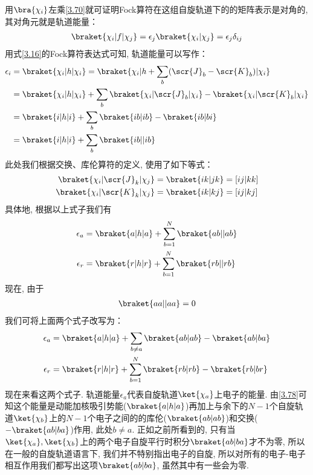 用$\bra{\chi_i}$左乘\eqref{3.70}就可证明Fock算符在这组自旋轨道下的的矩阵表示是对角的, 其对角元就是轨道能量：
\begin{align}
\braket{\chi_i|f|\chi_j} = \epsilon_j\braket{\chi_i|\chi_j} = \epsilon_j\delta_{ij}
\end{align}
用式\eqref{3.16}的Fock算符表达式可知, 轨道能量可以写作：
\begin{align}
\epsilon_i & = \braket{\chi_i|h|\chi_i} = \braket{\chi_i|h+\sum_b(\scr{J}_b-\scr{K}_b)|\chi_i}\notag\\
           & = \braket{\chi_i|h|\chi_i} + \sum_b\braket{\chi_i|\scr{J}_b|\chi_i} - \braket{\chi_i|\scr{K}_b|\chi_i}\notag\\
           & = \braket{i|h|i} + \sum_b\braket{ib|ib} - \braket{ib|bi}\notag\\
           & = \braket{i|h|i} + \sum_b\braket{ib||ib}
\label{3.72}
\end{align}
此处我们根据交换、库伦算符的定义, 使用了如下等式：
\begin{align}
\braket{\chi_i|\scr{J}_k|\chi_j} & = \braket{ik|jk} = [ij|kk]\\
\braket{\chi_i|\scr{K}_k|\chi_j} & = \braket{ik|kj} = [ij|kj]
\end{align}
具体地, 根据以上式子我们有
\begin{align}
\label{3.75}
\epsilon_a & = \braket{a|h|a} + \sum_{b=1}^{N}\braket{ab||ab}\\
\epsilon_r & = \braket{r|h|r} + \sum_{b=1}^{N}\braket{rb||rb}
\label{3.76}
\end{align}
现在, 由于
\begin{align}
\braket{aa||aa} = 0
\end{align}
我们可将上面两个式子改写为：
\begin{align}
\label{3.78}
\epsilon_a & = \braket{a|h|a} + \sum_{b\neq a}\braket{ab|ab} - \braket{ab|ba}\\
\epsilon_r & = \braket{r|h|r} + \sum_{b=1}^{N}\braket{rb|rb} - \braket{rb|br}
\label{3.79}
\end{align}
现在来看这两个式子. 轨道能量$\epsilon_a$代表自旋轨道$\ket{\chi_a}$上电子的能量. 由\eqref{3.78}可知这个能量是动能加核吸引势能($\braket{a|h|a}$)再加上与余下的$N-1$个自旋轨道$\ket{\chi_b}$上的$N-1$个电子之间的的库伦($\braket{ab|ab}$)和交换($-\braket{ab|ba}$)作用, 此处$b \neq a$. 正如之前所看到的, 只有当$\ket{\chi_a},\ket{\chi_b}$上的两个电子自旋平行时积分$\braket{ab|ba}$才不为零, 所以在一般的自旋轨道语言下, 我们并不特别指出电子的自旋, 所以对所有的电子-电子相互作用我们都写出这项$\braket{ab|ba}$, 虽然其中有一些会为零.

